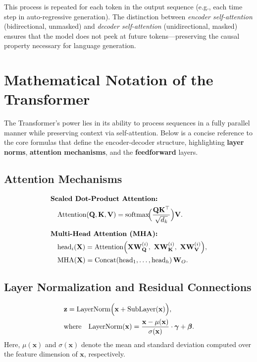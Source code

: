 \noindent
This process is repeated for each token in the output sequence (e.g., each time step in auto-regressive generation). The distinction between \emph{encoder self-attention} (bidirectional, unmasked) and \emph{decoder self-attention} (unidirectional, masked) ensures that the model does not peek at future tokens—preserving the causal property necessary for language generation.


\section{Mathematical Notation of the Transformer}
\label{sec:transformer_notation}

\noindent
The Transformer’s power lies in its ability to process sequences in a fully parallel manner while preserving context via self-attention. Below is a concise reference to the core formulas that define the encoder-decoder structure, highlighting \textbf{layer norms}, \textbf{attention mechanisms}, and the \textbf{feedforward} layers.

\subsection{Attention Mechanisms}
\begin{align}
&\textbf{Scaled Dot-Product Attention:}\notag\\
&\quad \text{Attention}(\mathbf{Q}, \mathbf{K}, \mathbf{V}) 
= \text{softmax}\!\Bigl(\frac{\mathbf{Q} \mathbf{K}^\top}{\sqrt{d_k}}\Bigr) \mathbf{V}. \label{eq:attention} \\[6pt]
&\textbf{Multi-Head Attention (MHA):}\notag\\
&\quad
\text{head}_i(\mathbf{X}) 
= 
\text{Attention}\Bigl(
\mathbf{X}\mathbf{W}_\mathbf{Q}^{(i)},\ 
\mathbf{X}\mathbf{W}_\mathbf{K}^{(i)},\ 
\mathbf{X}\mathbf{W}_\mathbf{V}^{(i)}
\Bigr), \label{eq:mha_head} \\
&\quad 
\text{MHA}(\mathbf{X}) 
= 
\text{Concat}(\text{head}_1, \ldots, \text{head}_h)\,\mathbf{W}_O. \label{eq:mha_final}
\end{align}

\subsection{Layer Normalization and Residual Connections}
\begin{align*}
&\mathbf{z} = \text{LayerNorm}\Bigl(\mathbf{x} + \text{SubLayer}(\mathbf{x})\Bigr), \\
&\text{where} \quad
\text{LayerNorm}(\mathbf{x}) 
= 
\frac{\mathbf{x} - \mu(\mathbf{x})}{\sigma(\mathbf{x})} \cdot \boldsymbol{\gamma} + \boldsymbol{\beta}.
\end{align*}
Here, $\mu(\mathbf{x})$ and $\sigma(\mathbf{x})$ denote the mean and standard deviation computed over the feature dimension of $\mathbf{x}$, respectively.

